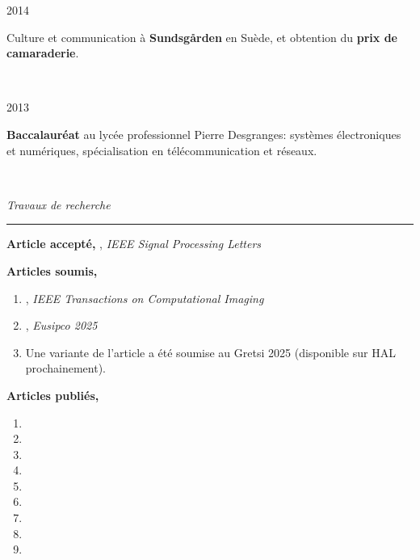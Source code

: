 {	\noindent
	\begin{minipage}{0.20\textwidth}
		\color{MyGray} 2014
	\end{minipage}
	\hfill
	\begin{minipage}{0.70\textwidth}
		Culture et communication à \textbf{Sundsgården} en Suède, et obtention du \textbf{prix de camaraderie}.
	\end{minipage}\\
	\vspace{2mm}
	
	\noindent
	\begin{minipage}{0.20\textwidth}
		\color{MyGray} 2013
	\end{minipage}
	\hfill
	\begin{minipage}{0.70\textwidth}
		\textbf{Baccalauréat} au lycée professionnel Pierre Desgranges: systèmes électroniques et numériques, spécialisation en télécommunication et réseaux.
	\end{minipage}\\
	\vspace{5mm}
	
	\noindent
	\textit{\Large \color{MyGray} \hspace{5mm} Travaux de recherche}
	\vspace{2mm}
	{\color{DefaultGray}\hrule height .1pt}
	\vspace{4mm}
	
	\vspace{5mm}
	
	\textbf{Article accepté,} , \textit{IEEE Signal Processing Letters}
	
	\vspace{5mm}
	
	\textbf{Articles soumis,}
	\begin{enumerate}
		\item {}, \textit{IEEE Transactions on Computational Imaging}
		\item {}, \textit{Eusipco 2025}
		\item Une variante de l'article  a été soumise au Gretsi 2025 (disponible sur HAL prochainement).
	\end{enumerate}
	
	\textbf{Articles publiés,}
	\begin{enumerate}
		\item {}
		\item {}
		\item {}
		\item {}
		\item {}
		\item {}
		\item {}
		\item {}
		\item {}
	\end{enumerate}
	
}
